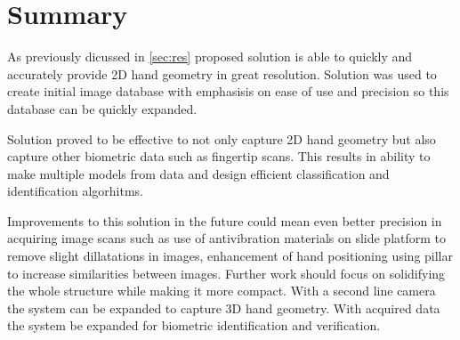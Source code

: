 \documentclass[11pt,a4paper]{article}
\begin{document}
\section{Summary}
\label{sec:sum}
As previously dicussed in \ref{sec:res} proposed solution is able to quickly and accurately provide 2D hand geometry in great resolution. Solution was
used to create initial image database with emphasisis on ease of use and precision so this database can be quickly expanded.

Solution proved to be effective to not only capture 2D hand geometry but also capture other biometric data such as fingertip scans. This results in
ability to make multiple models from data and design efficient classification and identification algorhitms.

Improvements to this solution in the future could mean even better precision in acquiring image scans such as use of antivibration materials on
slide platform to remove slight dillatations in images, enhancement of hand positioning using pillar to increase similarities between images.
Further work should focus on solidifying the whole structure while making it more compact.
With a second line camera the system can be expanded to capture 3D hand geometry. With acquired data the system be expanded for biometric identification and verification.
\end{document}
